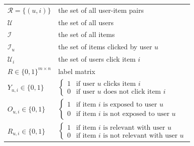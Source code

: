 \documentclass[sigconf]{acmart}
\begin{document}
\begin{table}[!htb]
\begin{center}
\begin{tabular}{ l|l}
			$\mathcal{R} = \{(u, i)\}$ & the set of all user-item pairs \\
			$\mathcal{U}$ & the set of all users \\
			$\mathcal{I}$ & the set of all items \\
			$\mathcal{I}_u$ & the set of items clicked by user $u$ \\
			$\mathcal{U}_i$ & the set of users click item $i$ \\
			$R \in \{0, 1\}^{m \times n}$ & label matrix \\				
			$Y_{u,i} \in \{0,1\}$ & 
			$			\begin{cases}
			1&  \text{if user } u \text{ clicks item } i \\
			0&  \text{if user } u \text{ does not click item } i 
			\end{cases}$ \\	
			
			$O_{u,i} \in \{0,1\}$ & 
			$			\begin{cases}
			1&  \text{if item } i \text{ is exposed to user } u \\
			0&  \text{if item } i \text{ is not exposed to user } u
			\end{cases}$ \\	
			$R_{u,i} \in \{0,1\}$ & 
			$			\begin{cases}
			1&  \text{if item } i \text{ is relevant with user } u \\
			0&  \text{if item } i \text{ is not relevant with user } u
			\end{cases}$ \\				
			\hline
			

\end{tabular}
\end{center}
\end{table}
\end{document}
